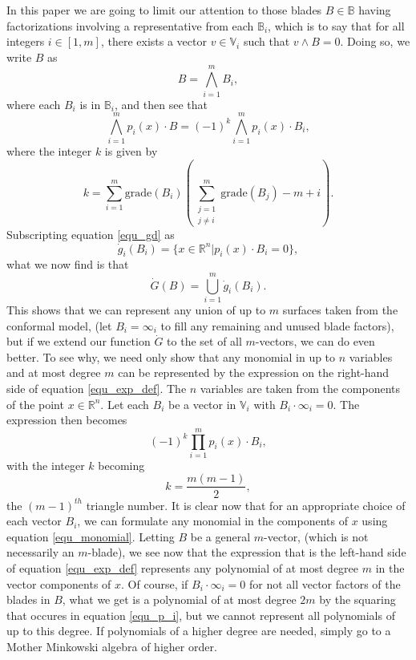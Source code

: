 \documentclass{ecgd-l}
\numberwithin{equation}{section}
\newcommand{\R}{\mathbb{R}}
\newcommand{\B}{\mathbb{B}}
\newcommand{\V}{\mathbb{V}}
\newcommand{\gd}{\dot{g}}
\newcommand{\Gd}{\dot{G}}
\newcommand{\nvai}{\infty}
\newcommand{\grade}{\mbox{grade}}
\begin{document}
In this paper we are going to limit our attention
to those blades $B\in\B$ having factorizations involving a representative from each $\B_i$,
which is to say that for all integers $i\in[1,m]$, there exists a vector $v\in\V_i$ such that $v\wedge B=0$.
Doing so, we write $B$ as
\begin{equation}\label{equ_B_factored}
B = \bigwedge_{i=1}^m B_i,
\end{equation}
where each $B_i$ is in $\B_i$, and then see that
\begin{equation}\label{equ_exp_def}
\bigwedge_{i=1}^m p_i(x)\cdot B = (-1)^k\bigwedge_{i=1}^m p_i(x)\cdot B_i,
\end{equation}
where the integer $k$ is given by
\begin{equation}\label{equ_k}
k=\sum_{i=1}^m \grade(B_i)\left(\sum_{\substack{j=1\\j\neq i}}^m \grade(B_j)-m+i\right).
\end{equation}
Subscripting equation \eqref{equ_gd} as
\begin{equation*}
\gd_i(B_i) = \{x\in\R^n|p_i(x)\cdot B_i=0\},
\end{equation*}
what we now find is that
\begin{equation*}
\Gd(B) = \bigcup_{i=1}^m\gd_i(B_i).
\end{equation*}
This shows that we can represent any union of up to $m$ surfaces taken from the conformal model,
(let $B_i=\nvai_i$ to fill any remaining and unused blade factors),
but if we extend our function $\Gd$ to the set of all $m$-vectors, we can do even better.
To see why, we need only show that any monomial in up to $n$ variables and at most
degree $m$ can be represented by the expression on the right-hand side of equation \eqref{equ_exp_def}.
The $n$ variables are taken from the components of the point $x\in\R^n$.  Let each $B_i$ be a vector in $\V_i$
with $B_i\cdot\nvai_i=0$.
The expression then becomes
\begin{equation}\label{equ_monomial}
(-1)^k\prod_{i=1}^m p_i(x)\cdot B_i,
\end{equation}
with the integer $k$ becoming
\begin{equation}\label{equ_tri_numb}
k = \frac{m(m-1)}{2},
\end{equation}
the $(m-1)^{th}$ triangle number.
It is clear now that for an appropriate choice of each vector $B_i$, we can formulate any
monomial in the components of $x$ using equation \eqref{equ_monomial}.
Letting $B$ be a general $m$-vector, (which is not necessarily an $m$-blade),
we see now that the expression
that is the left-hand side of equation \eqref{equ_exp_def} represents
any polynomial of at most degree $m$
in the vector components of $x$.
Of course, if $B_i\cdot\nvai_i=0$ for not all vector factors of the blades in $B$, what
we get is a polynomial of at most degree $2m$ by the squaring that
occures in equation \eqref{equ_p_i}, but we cannot represent all polynomials
of up to this degree.  If polynomials of a higher degree are needed, simply go to a
Mother Minkowski algebra of higher order.
\end{document}
